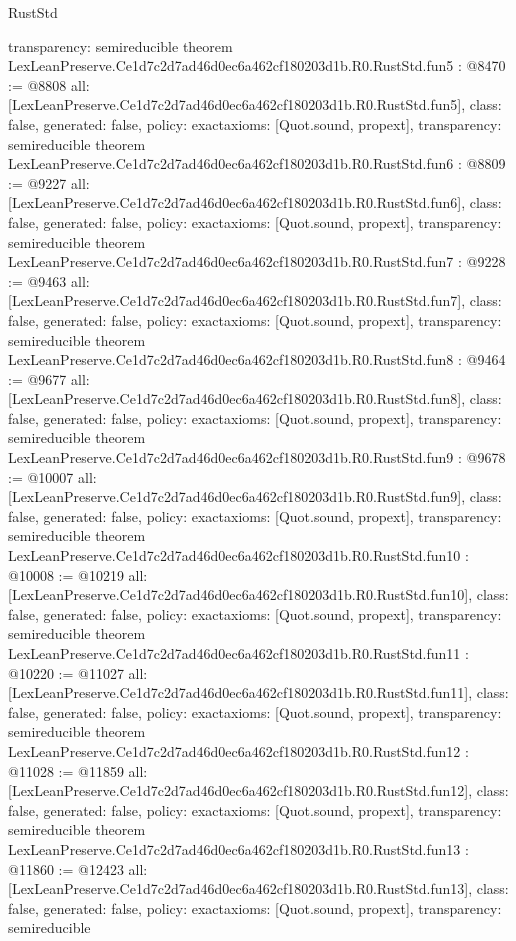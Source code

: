 \begin{lexlean}{RustStd}
\begin{coremodule}
{  transparency: semireducible
}
theorem LexLeanPreserve.Ce1d7c2d7ad46d0ec6a462cf180203d1b.R0.RustStd.fun5 : @8470 := @8808 {
  all: [LexLeanPreserve.Ce1d7c2d7ad46d0ec6a462cf180203d1b.R0.RustStd.fun5],
  class: false,
  generated: false,
  policy: exact{axioms: [Quot.sound, propext]},
  transparency: semireducible
}
theorem LexLeanPreserve.Ce1d7c2d7ad46d0ec6a462cf180203d1b.R0.RustStd.fun6 : @8809 := @9227 {
  all: [LexLeanPreserve.Ce1d7c2d7ad46d0ec6a462cf180203d1b.R0.RustStd.fun6],
  class: false,
  generated: false,
  policy: exact{axioms: [Quot.sound, propext]},
  transparency: semireducible
}
theorem LexLeanPreserve.Ce1d7c2d7ad46d0ec6a462cf180203d1b.R0.RustStd.fun7 : @9228 := @9463 {
  all: [LexLeanPreserve.Ce1d7c2d7ad46d0ec6a462cf180203d1b.R0.RustStd.fun7],
  class: false,
  generated: false,
  policy: exact{axioms: [Quot.sound, propext]},
  transparency: semireducible
}
theorem LexLeanPreserve.Ce1d7c2d7ad46d0ec6a462cf180203d1b.R0.RustStd.fun8 : @9464 := @9677 {
  all: [LexLeanPreserve.Ce1d7c2d7ad46d0ec6a462cf180203d1b.R0.RustStd.fun8],
  class: false,
  generated: false,
  policy: exact{axioms: [Quot.sound, propext]},
  transparency: semireducible
}
theorem LexLeanPreserve.Ce1d7c2d7ad46d0ec6a462cf180203d1b.R0.RustStd.fun9 : @9678 := @10007 {
  all: [LexLeanPreserve.Ce1d7c2d7ad46d0ec6a462cf180203d1b.R0.RustStd.fun9],
  class: false,
  generated: false,
  policy: exact{axioms: [Quot.sound, propext]},
  transparency: semireducible
}
theorem LexLeanPreserve.Ce1d7c2d7ad46d0ec6a462cf180203d1b.R0.RustStd.fun10 : @10008 := @10219 {
  all: [LexLeanPreserve.Ce1d7c2d7ad46d0ec6a462cf180203d1b.R0.RustStd.fun10],
  class: false,
  generated: false,
  policy: exact{axioms: [Quot.sound, propext]},
  transparency: semireducible
}
theorem LexLeanPreserve.Ce1d7c2d7ad46d0ec6a462cf180203d1b.R0.RustStd.fun11 : @10220 := @11027 {
  all: [LexLeanPreserve.Ce1d7c2d7ad46d0ec6a462cf180203d1b.R0.RustStd.fun11],
  class: false,
  generated: false,
  policy: exact{axioms: [Quot.sound, propext]},
  transparency: semireducible
}
theorem LexLeanPreserve.Ce1d7c2d7ad46d0ec6a462cf180203d1b.R0.RustStd.fun12 : @11028 := @11859 {
  all: [LexLeanPreserve.Ce1d7c2d7ad46d0ec6a462cf180203d1b.R0.RustStd.fun12],
  class: false,
  generated: false,
  policy: exact{axioms: [Quot.sound, propext]},
  transparency: semireducible
}
theorem LexLeanPreserve.Ce1d7c2d7ad46d0ec6a462cf180203d1b.R0.RustStd.fun13 : @11860 := @12423 {
  all: [LexLeanPreserve.Ce1d7c2d7ad46d0ec6a462cf180203d1b.R0.RustStd.fun13],
  class: false,
  generated: false,
  policy: exact{axioms: [Quot.sound, propext]},
  transparency: semireducible
}
\end{coremodule}
\end{lexlean}
